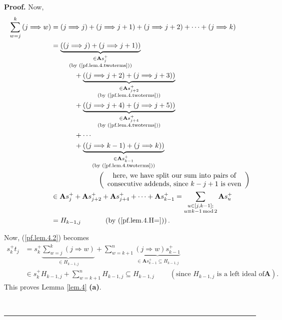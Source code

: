 \documentclass[numbers=enddot,12pt,final,onecolumn,notitlepage]{scrartcl}%
\theoremstyle{definition}
\newenvironment{proof}[1][Proof]{\noindent\textbf{#1.} }{\ \rule{0.5em}{0.5em}}
\let\sumnonlimits\sum
\renewcommand{\sum}{\sumnonlimits\limits}
\begin{document}
\begin{proof}
Now,%
\begin{align*}
\sum_{w=j}^{k}\left(  j\Longrightarrow w\right)   &  =\left(  j\Longrightarrow
j\right)  +\left(  j\Longrightarrow j+1\right)  +\left(  j\Longrightarrow
j+2\right)  +\cdots+\left(  j\Longrightarrow k\right) \\
&  =\underbrace{\left(  \left(  j\Longrightarrow j\right)  +\left(
j\Longrightarrow j+1\right)  \right)  }_{\substack{\in\mathbf{A}s_{j}%
^{+}\\\text{(by (\ref{pf.lem.4.twoterms}))}}}\\
&  \ \ \ \ \ \ \ \ \ \ +\underbrace{\left(  \left(  j\Longrightarrow
j+2\right)  +\left(  j\Longrightarrow j+3\right)  \right)  }_{\substack{\in
\mathbf{A}s_{j+2}^{+}\\\text{(by (\ref{pf.lem.4.twoterms}))}}}\\
&  \ \ \ \ \ \ \ \ \ \ +\underbrace{\left(  \left(  j\Longrightarrow
j+4\right)  +\left(  j\Longrightarrow j+5\right)  \right)  }_{\substack{\in
\mathbf{A}s_{j+4}^{+}\\\text{(by (\ref{pf.lem.4.twoterms}))}}}\\
&  \ \ \ \ \ \ \ \ \ \ +\cdots\\
&  \ \ \ \ \ \ \ \ \ \ +\underbrace{\left(  \left(  j\Longrightarrow
k-1\right)  +\left(  j\Longrightarrow k\right)  \right)  }_{\substack{\in
\mathbf{A}s_{k-1}^{+}\\\text{(by (\ref{pf.lem.4.twoterms}))}}}\\
&  \ \ \ \ \ \ \ \ \ \ \ \ \ \ \ \ \ \ \ \ \left(
\begin{array}
[c]{c}%
\text{here, we have split our sum into pairs of}\\
\text{consecutive addends, since }k-j+1\text{ is even}%
\end{array}
\right) \\
&  \in\mathbf{A}s_{j}^{+}+\mathbf{A}s_{j+2}^{+}+\mathbf{A}s_{j+4}^{+}%
+\cdots+\mathbf{A}s_{k-1}^{+}=\sum_{\substack{u\in\left[  j,k-1\right]
;\\u\equiv k-1\operatorname{mod}2}}\mathbf{A}s_{u}^{+}\\
&  =H_{k-1,j}\ \ \ \ \ \ \ \ \ \ \left(  \text{by (\ref{pf.lem.4.H=})}\right)
.
\end{align*}


Now, (\ref{pf.lem.4.2}) becomes%
\begin{align*}
s_{k}^{+}t_{j}  &  =s_{k}^{+}\underbrace{\sum_{w=j}^{k}\left(
j\Longrightarrow w\right)  }_{\in H_{k-1,j}}+\sum_{w=k+1}^{n}%
\underbrace{\left(  j\Longrightarrow w\right)  s_{k-1}^{+}}_{\in
\mathbf{A}s_{k-1}^{+}\subseteq H_{k-1,j}}\\
&  \in s_{k}^{+}H_{k-1,j}+\sum_{w=k+1}^{n}H_{k-1,j}\subseteq H_{k-1,j}%
\ \ \ \ \ \ \ \ \ \ \left(  \text{since }H_{k-1,j}\text{ is a left ideal of
}\mathbf{A}\right)  .
\end{align*}
This proves Lemma \ref{lem.4} \textbf{(a)}. \medskip


\end{proof}
\end{document}
